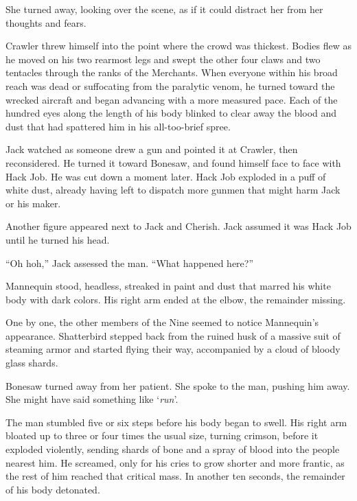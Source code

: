 She turned away, looking over the scene, as if it could distract her from her thoughts and fears.



Crawler threw himself into the point where the crowd was thickest.  Bodies flew as he moved on his two rearmost legs and swept the other four claws and two tentacles through the ranks of the Merchants.  When everyone within his broad reach was dead or suffocating from the paralytic venom, he turned toward the wrecked aircraft and began advancing with a more measured pace.  Each of the hundred eyes along the length of his body blinked to clear away the blood and dust that had spattered him in his all-too-brief spree.



Jack watched as someone drew a gun and pointed it at Crawler, then reconsidered.  He turned it toward Bonesaw, and found himself face to face with Hack Job.  He was cut down a moment later.  Hack Job exploded in a puff of white dust, already having left to dispatch more gunmen that might harm Jack or his maker.



Another figure appeared next to Jack and Cherish.  Jack assumed it was Hack Job until he turned his head.



``Oh hoh,'' Jack assessed the man.  ``What happened here?''



Mannequin stood, headless, streaked in paint and dust that marred his white body with dark colors.  His right arm ended at the elbow, the remainder missing.



One by one, the other members of the Nine seemed to notice Mannequin's appearance.  Shatterbird stepped back from the ruined husk of a massive suit of steaming armor and started flying their way, accompanied by a cloud of bloody glass shards.



Bonesaw turned away from her patient.  She spoke to the man, pushing him away.  She might have said something like `\emph{run}'.



The man stumbled five or six steps before his body began to swell.  His right arm bloated up to three or four times the usual size, turning crimson, before it exploded violently, sending shards of bone and a spray of blood into the people nearest him.  He screamed, only for his cries to grow shorter and more frantic, as the rest of him reached that critical mass.  In another ten seconds, the remainder of his body detonated.



